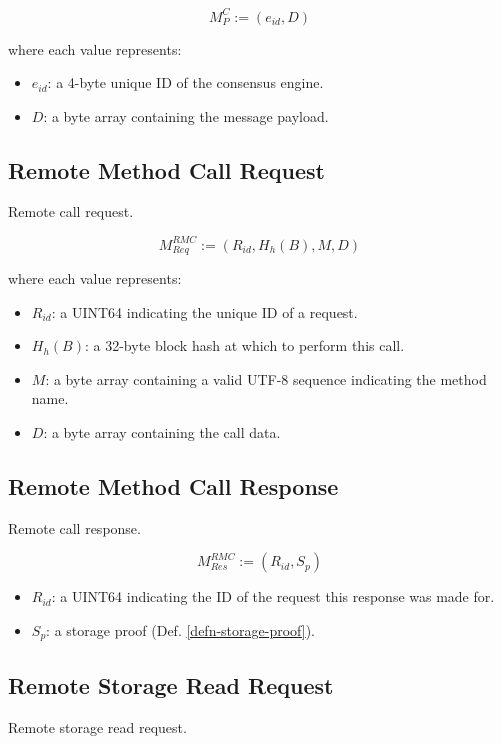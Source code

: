 \documentclass{book}
\begin{document}
\[
    M^C_P := (e_{id}, D)
\]

where each value represents:

\begin{itemize}
    \item $e_{id}$: a 4-byte unique ID of the consensus engine.
    \item $D$: a byte array containing the message payload.
\end{itemize}

\subsection{Remote Method Call Request}

Remote call request.

\[
    M^{RMC}_{Req} := (R_{id}, H_h(B), M, D)
\]

where each value represents:

\begin{itemize}
    \item $R_{id}$: a UINT64 indicating the unique ID of a request.
    \item $H_h(B)$: a 32-byte block hash at which to perform this call.
    \item $M$: a byte array containing a valid UTF-8 sequence indicating the
    method name.
    \item $D$: a byte array containing the call data.
\end{itemize}

\subsection{Remote Method Call Response}

Remote call response.

\[
    M^{RMC}_{Res} := (R_{id}, S_p)
\]

\begin{itemize}
    \item $R_{id}$: a UINT64 indicating the ID of the request this response was
    made for.
    \item $S_p$: a storage proof (Def. \ref{defn-storage-proof}).
\end{itemize}

\subsection{Remote Storage Read Request}

Remote storage read request.
\end{document}
